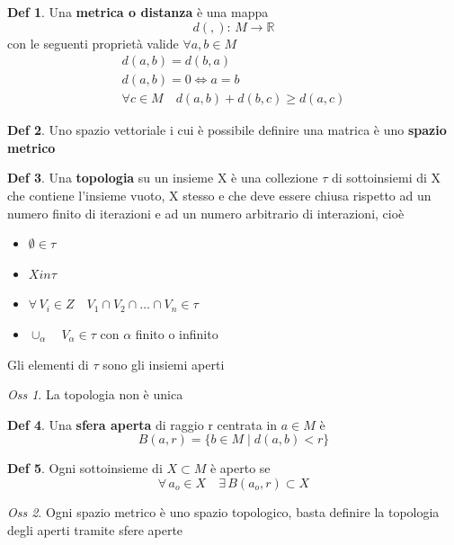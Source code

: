 \documentclass[a4paper,11pt]{report}
\theoremstyle{remark}
\newtheorem*{oss}{Oss}
\theoremstyle{definition}
\newtheorem*{Def}{Def}
\newcommand{\R}{\mathbb{R}}
\begin{document}
\begin{Def}
	Una \textbf{metrica o distanza} è una mappa 
	\[d(,): \, M \to \R\]
	con le seguenti proprietà valide $\forall a,b \in M$
	\begin{gather*}
		d(a,b) = d(b,a) \\
		d(a,b) = 0 \iff a=b \\
		\forall c \in M \quad d(a,b)+d(b,c) \ge d(a,c)
	\end{gather*}
\end{Def}

\begin{Def}
	Uno spazio vettoriale i cui è possibile definire una matrica è uno \textbf{spazio metrico}
\end{Def}

\begin{Def}
	Una \textbf{topologia} su un insieme X è una collezione $\tau$ di sottoinsiemi di X che contiene l'insieme vuoto, X stesso e che deve essere chiusa rispetto ad un numero finito di iterazioni e ad un numero arbitrario di interazioni, cioè
	\begin{itemize}
		\item $\emptyset \in \tau$
 		\item $X in \tau$
		\item $\forall \, V_i \in Z \quad V_1 \cap V_2 \cap \dots \cap V_n \in \tau $
		\item $\cup_\alpha \quad V_\alpha \in \tau$ \; con $\alpha$ finito o infinito
	\end{itemize} 
	Gli elementi di $\tau$ sono gli insiemi aperti 
\end{Def}

\begin{oss}
	La topologia non è unica
\end{oss}

\begin{Def}
	Una \textbf{sfera aperta} di raggio r centrata in $a \in M$ è
	\[B(a,r) = \{b \in M \; | \; d(a,b)<r\}\]
\end{Def}

\begin{Def}
	Ogni sottoinsieme di $X\subset M$ è aperto se 
	\[\forall \, a_o \in X \quad \exists \, B(a_o,r) \subset X\]
\end{Def}

\begin{oss}
	Ogni spazio metrico è uno spazio topologico, basta definire la topologia degli aperti tramite sfere aperte
\end{oss}
\end{document}
